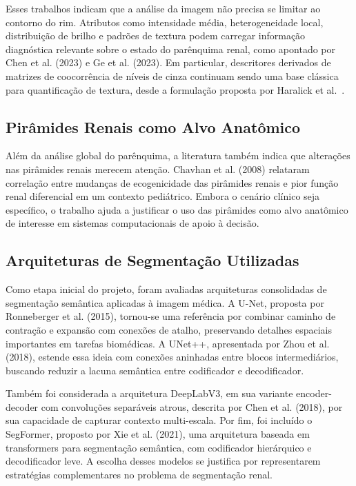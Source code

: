 \documentclass[12pt]{article}
\begin{document}
Esses trabalhos indicam que a análise da imagem não precisa se limitar ao contorno do rim. Atributos como intensidade média, heterogeneidade local, distribuição de brilho e padrões de textura podem carregar informação diagnóstica relevante sobre o estado do parênquima renal, como apontado por Chen et al. (2023) e Ge et al. (2023).
Em particular, descritores derivados de matrizes de coocorrência de níveis de cinza continuam sendo uma base clássica para quantificação de textura, desde a formulação proposta por Haralick et al.~\cite{Haralick1973}.

\subsection{Pirâmides Renais como Alvo Anatômico}

Além da análise global do parênquima, a literatura também indica que alterações nas pirâmides renais merecem atenção. Chavhan et al. (2008) relataram correlação entre mudanças de ecogenicidade das pirâmides renais e pior função renal diferencial em um contexto pediátrico. Embora o cenário clínico seja específico, o trabalho ajuda a justificar o uso das pirâmides como alvo anatômico de interesse em sistemas computacionais de apoio à decisão.

\subsection{Arquiteturas de Segmentação Utilizadas}

Como etapa inicial do projeto, foram avaliadas arquiteturas consolidadas de segmentação semântica aplicadas à imagem médica. A U-Net, proposta por Ronneberger et al. (2015), tornou-se uma referência por combinar caminho de contração e expansão com conexões de atalho, preservando detalhes espaciais importantes em tarefas biomédicas. A UNet++, apresentada por Zhou et al. (2018), estende essa ideia com conexões aninhadas entre blocos intermediários, buscando reduzir a lacuna semântica entre codificador e decodificador.

Também foi considerada a arquitetura DeepLabV3, em sua variante encoder-decoder com convoluções separáveis atrous, descrita por Chen et al. (2018), por sua capacidade de capturar contexto multi-escala. Por fim, foi incluído o SegFormer, proposto por Xie et al. (2021), uma arquitetura baseada em transformers para segmentação semântica, com codificador hierárquico e decodificador leve. A escolha desses modelos se justifica por representarem estratégias complementares no problema de segmentação renal.
\end{document}
